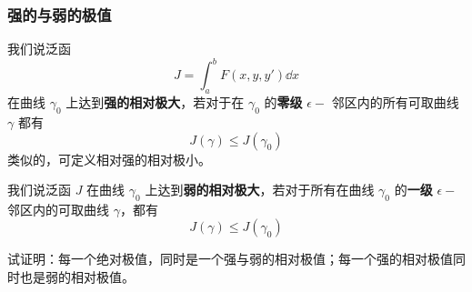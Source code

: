  \subsubsection{强的与弱的极值}
 我们说泛函
 \begin{equation}
 J=\int_a^b F(x,y,y')\dd x
 \end{equation}
 在曲线 $\gamma_0$ 上达到\textbf{强的相对极大}，若对于在 $\gamma_0$ 的\textbf{零级} $\epsilon-$ 邻区内的所有可取曲线 $\gamma$ 都有
 \begin{equation}
 J(\gamma)\leq J(\gamma_0)
 \end{equation}
 类似的，可定义相对强的相对极小。

我们说泛函 $J$ 在曲线 $\gamma_0$ 上达到\textbf{弱的相对极大}，若对于所有在曲线 $\gamma_0$ 的\textbf{一级} $\epsilon-$ 邻区内的可取曲线 $\gamma$，都有
\begin{equation}
J(\gamma)\leq J(\gamma_0)
\end{equation}
\begin{exercise}{}\label{AbPol_exe1}
试证明：每一个绝对极值，同时是一个强与弱的相对极值；每一个强的相对极值同时也是弱的相对极值。
\end{exercise}